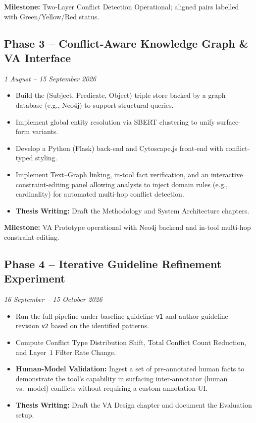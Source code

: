 \documentclass[11pt]{article}
\begin{document}
\textbf{Milestone:} Two-Layer Conflict Detection Operational; aligned pairs labelled with Green/Yellow/Red status.

\subsection*{Phase 3 -- Conflict-Aware Knowledge Graph \& VA Interface}
\textit{1 August -- 15 September 2026}

\begin{itemize}[leftmargin=1.5em, itemsep=2pt]
    \item Build the (Subject, Predicate, Object) triple store backed by a graph database (e.g., Neo4j) to support structural queries.
    \item Implement global entity resolution via SBERT clustering to unify surface-form variants.
    \item Develop a Python (Flask) back-end and Cytoscape.js front-end with conflict-typed styling.
    \item Implement Text--Graph linking, in-tool fact verification, and an interactive constraint-editing panel allowing analysts to inject domain rules (e.g., cardinality) for automated multi-hop conflict detection.
    \item \textbf{Thesis Writing:} Draft the Methodology and System Architecture chapters.
\end{itemize}

\textbf{Milestone:} VA Prototype operational with Neo4j backend and in-tool multi-hop constraint editing.

\subsection*{Phase 4 -- Iterative Guideline Refinement Experiment}
\textit{16 September -- 15 October 2026}

\begin{itemize}[leftmargin=1.5em, itemsep=2pt]
    \item Run the full pipeline under baseline guideline \texttt{v1} and author guideline revision \texttt{v2} based on the identified patterns.
    \item Compute Conflict Type Distribution Shift, Total Conflict Count Reduction, and Layer~1 Filter Rate Change.
    \item \textbf{Human-Model Validation:} Ingest a set of pre-annotated human facts to demonstrate the tool's capability in surfacing inter-annotator (human vs.\ model) conflicts without requiring a custom annotation UI.
    \item \textbf{Thesis Writing:} Draft the VA Design chapter and document the Evaluation setup.
\end{itemize}
\end{document}
